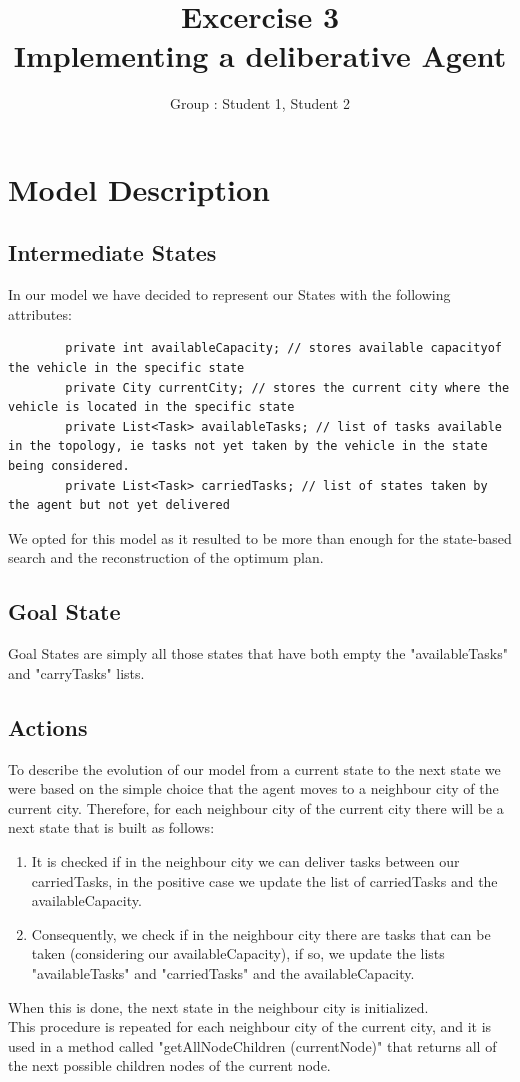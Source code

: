 \documentclass[11pt]{article}
\title{\bf Excercise 3\\ Implementing a deliberative Agent}
\author{Group \textnumero 15: Student 1, Student 2}
\begin{document}
\maketitle

\section{Model Description}

\subsection{Intermediate States}
In our model we have decided to represent our States with the following attributes:

\begin{lstlisting}
		private int availableCapacity; // stores available capacityof the vehicle in the specific state
    	private City currentCity; // stores the current city where the vehicle is located in the specific state 
    	private List<Task> availableTasks; // list of tasks available in the topology, ie tasks not yet taken by the vehicle in the state being considered.
    	private List<Task> carriedTasks; // list of states taken by the agent but not yet delivered
\end{lstlisting}We opted for this model as it resulted to be more than enough for the state-based search and the reconstruction of the optimum plan.


\subsection{Goal State}
Goal States are simply all those states that have both empty the "availableTasks" and "carryTasks" lists.

\subsection{Actions}
To describe the evolution of our model from a current state to the next state we were based on the simple choice that the agent moves to a neighbour city of the current city. Therefore, for each neighbour city of the current city there will be a next state that is built as follows:
\begin{enumerate}
\item It is checked if in the neighbour city we can deliver tasks between our carriedTasks, in the positive case we update the list of carriedTasks and the availableCapacity.
\item Consequently, we check if in the neighbour city there are tasks that can be taken (considering our availableCapacity), if so, we update the lists "availableTasks" and "carriedTasks" and the availableCapacity.
\end{enumerate}When this is done, the next state in the neighbour city is initialized.
\\
This procedure is repeated for each neighbour city of the current city, and it is used in a method called "getAllNodeChildren (currentNode)" that returns all of the next possible children nodes of the current node.
\end{document}
